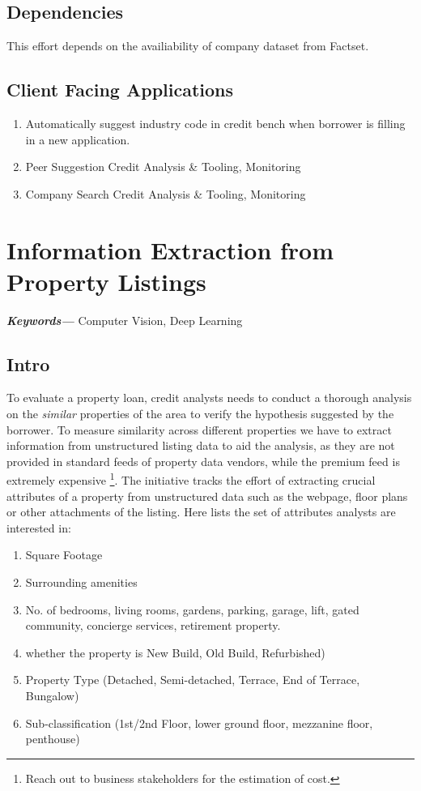\documentclass[]{article}
\providecommand{\keywords}[1]{\textbf{\textit{Keywords---}} #1}
\begin{document}
\subsection{Dependencies}
This effort depends on the availiability of company dataset from Factset.
\subsection{Client Facing Applications}
\begin{enumerate}
    \item Automatically suggest industry code in credit bench when 
    borrower is filling in a new application.
    \item Peer Suggestion \textrightarrow Credit Analysis \& Tooling,  
    Monitoring
    \item Company Search \textrightarrow Credit Analysis \& Tooling,  Monitoring
\end{enumerate}
\newpage
\section{Information Extraction from Property Listings}
\keywords{Computer Vision, Deep Learning}
\subsection{Intro}
To evaluate a property loan, credit analysts needs to conduct a thorough 
analysis on the \textit{similar} properties of the area to verify the 
hypothesis suggested by the borrower. To measure similarity across different 
properties we have to extract information from unstructured listing data to aid 
the analysis, as they are not provided in standard feeds of property data 
vendors, while the premium feed is extremely expensive \footnote{Reach out to 
business stakeholders for the estimation of cost.}. The initiative tracks the 
effort of extracting crucial attributes of a property from unstructured data 
such as the webpage, floor plans or other attachments  of the listing. Here 
lists the set of attributes analysts are interested in:

\begin{enumerate}
    \item Square Footage
    \item Surrounding amenities
    \item No. of bedrooms, living rooms, gardens, parking, garage, lift, gated 
    community, concierge services, retirement property.
    \item whether the property is New Build, Old Build, Refurbished)
    \item Property Type (Detached, Semi-detached, Terrace, End of Terrace, 
    Bungalow)
    \item Sub-classification (1st/2nd Floor, lower ground floor, mezzanine 
    floor, penthouse)
    
\end{enumerate}
\end{document}
